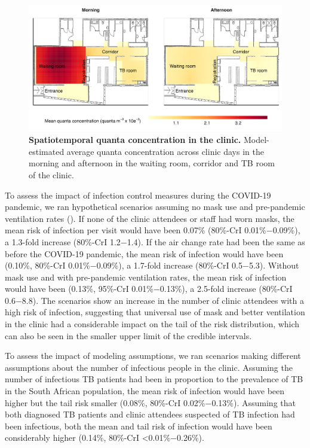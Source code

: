 \documentclass[fleqn,11pt]{wlscirep}
\begin{document}
\begin{figure}
    \centering
    \includegraphics{results/modeling/mean-quanta-concentration.png}
    \caption{\textbf{Spatiotemporal quanta concentration in the clinic.} Model-estimated average quanta concentration across clinic days in the morning and afternoon in the waiting room, corridor and TB room of the clinic.}
    \label{fig:main-modeling-results}
\end{figure}

To assess the impact of infection control measures during the COVID-19 pandemic, we ran hypothetical scenarios assuming no mask use and pre-pandemic ventilation rates (). If none of the clinic attendees or staff had worn masks, the mean risk of infection per visit would have been 0.07\% (80\%-CrI 0.01\%$-$0.09\%), a 1.3-fold increase (80\%-CrI 1.2$-$1.4). If the air change rate had been the same as before the COVID-19 pandemic, the mean risk of infection would have been (0.10\%, 80\%-CrI 0.01\%$-$0.09\%), a 1.7-fold increase (80\%-CrI 0.5$-$5.3). Without mask use and with pre-pandemic ventilation rates, the mean risk of infection would have been (0.13\%, 95\%-CrI 0.01\%$-$0.13\%), a 2.5-fold increase (80\%-CrI 0.6$-$8.8). The scenarios show an increase in the number of clinic attendees with a high risk of infection, suggesting that universal use of mask and better ventilation in the clinic had a considerable impact on the tail of the risk distribution, which can also be seen in the smaller upper limit of the credible intervals. 

To assess the impact of modeling assumptions, we ran scenarios making different assumptions about the number of infectious people in the clinic. Assuming the number of infectious TB patients had been in proportion to the prevalence of TB in the South African population, the mean risk of infection would have been higher but the tail risk smaller (0.08\%, 80\%-CrI 0.02\%$-$0.13\%). Assuming that both diagnosed TB patients and clinic attendees suspected of TB infection had been infectious, both the mean and tail risk of infection would have been considerably higher (0.14\%, 80\%-CrI <0.01\%$-$0.26\%).  
\end{document}
